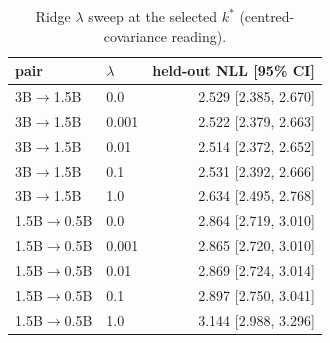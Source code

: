 \begin{table}[t]\centering\small\setlength{\tabcolsep}{4pt}\caption{Ridge $\lambda$ sweep at the selected $k^*$ (centred-covariance reading).}\label{tab:lambda}
\begin{tabular}{llr}\toprule
pair & $\lambda$ & held-out NLL [95\% CI] \\\midrule
3B$\to$1.5B & 0.0 & 2.529 [2.385, 2.670] \\
3B$\to$1.5B & 0.001 & 2.522 [2.379, 2.663] \\
3B$\to$1.5B & 0.01 & 2.514 [2.372, 2.652] \\
3B$\to$1.5B & 0.1 & 2.531 [2.392, 2.666] \\
3B$\to$1.5B & 1.0 & 2.634 [2.495, 2.768] \\
1.5B$\to$0.5B & 0.0 & 2.864 [2.719, 3.010] \\
1.5B$\to$0.5B & 0.001 & 2.865 [2.720, 3.010] \\
1.5B$\to$0.5B & 0.01 & 2.869 [2.724, 3.014] \\
1.5B$\to$0.5B & 0.1 & 2.897 [2.750, 3.041] \\
1.5B$\to$0.5B & 1.0 & 3.144 [2.988, 3.296] \\
\bottomrule\end{tabular}\end{table}

